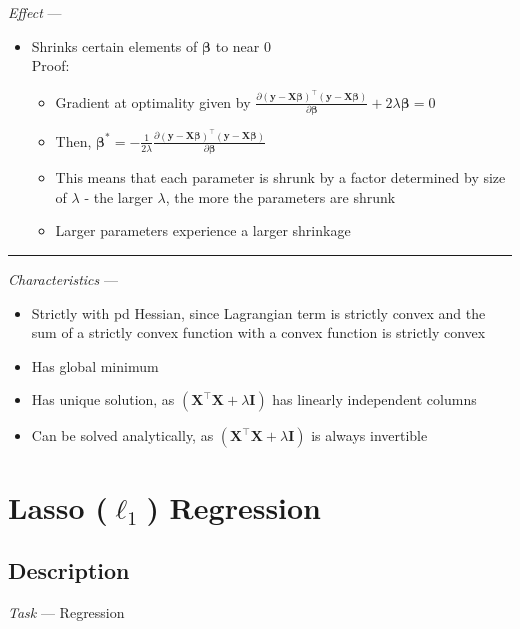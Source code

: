 \emph{Effect} ---
\begin{itemize}
    \item Shrinks certain elements of $\boldsymbol{\beta}$ to near 0\\
    Proof:
    \begin{itemize}
        \item Gradient at optimality given by $\frac{\partial ( \boldsymbol{y} - \boldsymbol{X}\boldsymbol{\beta})^\intercal( \boldsymbol{y} - \boldsymbol{X}\boldsymbol{\beta} )}{\partial \boldsymbol{\beta}} + 2 \lambda \boldsymbol{\beta} = 0$
        \item Then, $\boldsymbol{\beta}^* = -\frac{1}{2 \lambda} \frac{\partial ( \boldsymbol{y} - \boldsymbol{X}\boldsymbol{\beta})^\intercal( \boldsymbol{y} - \boldsymbol{X}\boldsymbol{\beta} )}{\partial \boldsymbol{\beta}}$
        \item This means that each parameter is shrunk by a factor determined by size of $\lambda$ - the larger $\lambda$, the more the parameters are shrunk
        \item Larger parameters experience a larger shrinkage
    \end{itemize}
\end{itemize}

{\color{lightgray}\hrule height 0.001mm}

\emph{Characteristics} --- 
\begin{itemize}
    \item Strictly with pd Hessian, since Lagrangian term is strictly convex and the sum of a strictly convex function with a convex function is strictly convex
    \item Has global minimum
    \item Has unique solution, as $(\boldsymbol{X}^\intercal \boldsymbol{X} + \lambda \boldsymbol{I})$ has linearly independent columns
    \item Can be solved analytically, as $(\boldsymbol{X}^\intercal \boldsymbol{X} + \lambda \boldsymbol{I})$ is always invertible
\end{itemize}

\section{Lasso ($\ell_1$) Regression}
\subsection*{Description}
\emph{Task} --- Regression

